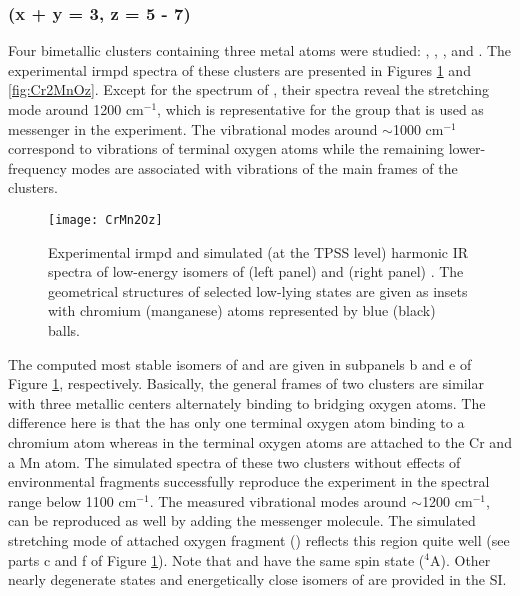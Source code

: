 \begin{refsection}


\subsubsection{ (x + y = 3, z = 5 - 7)}


Four bimetallic clusters  containing three metal atoms were studied: , , , and . The experimental \acrshort{irmpd} spectra of these clusters are presented in Figures \ref{fig:CrMn2Oz} and \ref{fig:Cr2MnOz}. Except for the spectrum of , their spectra reveal the  stretching mode around 1200 cm$^{-1}$, which is representative for the  group that is used as messenger in the experiment. The vibrational modes around $\sim$1000 cm$^{-1}$ correspond to vibrations of terminal oxygen atoms while the remaining lower-frequency modes are associated with vibrations of the main frames of the clusters. 

\begin{figure}
	\centering
	\texttt{[image: CrMn2Oz]}
	\caption{Experimental \acrshort{irmpd} and simulated (at the TPSS level) harmonic IR spectra of low-energy isomers of (left panel)  and (right panel) . The geometrical structures of selected low-lying states are given as insets with chromium (manganese) atoms represented by blue (black) balls.}
	\label{fig:CrMn2Oz}
\end{figure}

The computed most stable isomers of  and  are given in subpanels b and e of Figure \ref{fig:CrMn2Oz}, respectively. Basically, the general frames of two clusters are similar with three metallic centers alternately binding to bridging oxygen atoms. The difference here is that the  has only one terminal oxygen atom binding to a chromium atom whereas in  the terminal oxygen atoms are attached to the Cr and a Mn atom. The simulated spectra of these two clusters without effects of environmental  fragments successfully reproduce the experiment in the spectral range below 1100 cm$^{-1}$. The measured vibrational modes around $\sim$1200 cm$^{-1}$, can be reproduced as well by adding the  messenger molecule. The simulated  stretching mode of attached oxygen fragment () reflects this region quite well (see parts c and f of Figure \ref{fig:CrMn2Oz}). Note that  and  have the same spin state ($^4$A). Other nearly degenerate states and energetically close isomers of  are provided in the SI.




\end{refsection}
